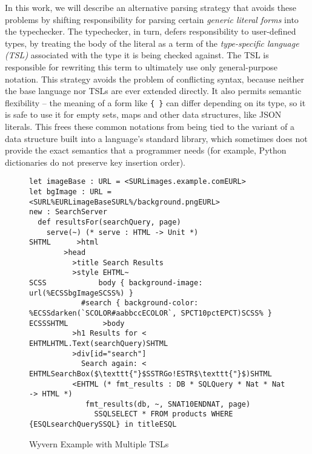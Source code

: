 In this work, we will describe an alternative parsing strategy that avoids these problems by shifting responsibility for parsing certain \emph{generic literal forms} into the typechecker. The typechecker, in turn, defers responsibility to user-defined types, by treating the body of the literal as a term of the   \emph{type-specific language (TSL)} associated with the type it is being checked against. The TSL is responsible for rewriting this term to ultimately use only general-purpose notation. This strategy avoids the problem of conflicting syntax, because neither the base language nor TSLs are ever extended directly. It also permits semantic flexibility -- the meaning of a form like \verb|{ }| can differ depending  on its type, so it is safe to use it for empty sets, maps and other data structures, like JSON literals. This frees these common notations from being tied to the variant of a  data structure built into a language's standard library, which sometimes does not provide the exact semantics that a programmer needs (for example, Python dictionaries do not preserve key insertion order).
\begin{figure}[t]
\begin{lstlisting}
let imageBase : URL = <SURLimages.example.comEURL>
let bgImage : URL = <SURL%EURLimageBaseSURL%/background.pngEURL>
new : SearchServer
  def resultsFor(searchQuery, page)
    serve(~) (* serve : HTML -> Unit *)
SHTML      >html
        >head
          >title Search Results
          >style EHTML~
SCSS            body { background-image: url(%ECSSbgImageSCSS%) }
            #search { background-color: %ECSSdarken(`SCOLOR#aabbccECOLOR`, SPCT10pctEPCT)SCSS% }
ECSSSHTML        >body
          >h1 Results for < EHTMLHTML.Text(searchQuery)SHTML
          >div[id="search"]
            Search again: < EHTMLSearchBox($\texttt{"}$SSTRGo!ESTR$\texttt{"}$)SHTML
          <EHTML (* fmt_results : DB * SQLQuery * Nat * Nat -> HTML *)
             fmt_results(db, ~, SNAT10ENDNAT, page)
               SSQLSELECT * FROM products WHERE {ESQLsearchQuerySSQL} in titleESQL
\end{lstlisting}
\vspace{-8px}
\caption{Wyvern Example with Multiple TSLs}
\label{f-example}
\end{figure}
